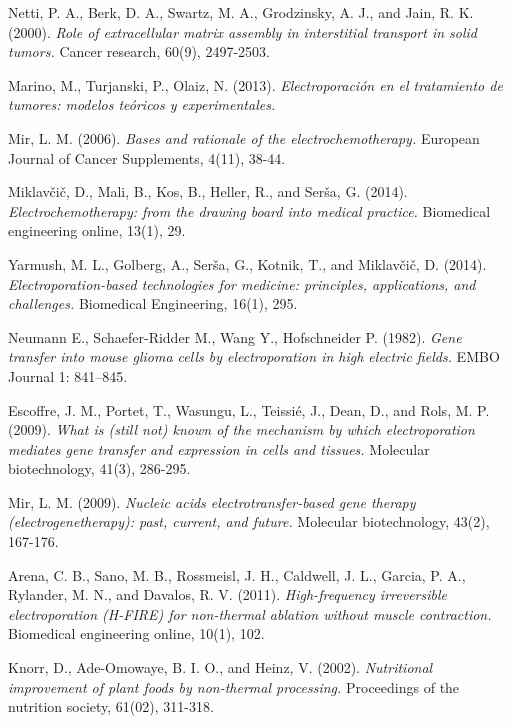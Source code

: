 \backmatter


\begin{thebibliography}{99}
	
	Netti, P. A., Berk, D. A., Swartz, M. A., Grodzinsky, A. J., and Jain, R. K. (2000). \emph{Role of extracellular matrix assembly in interstitial transport in solid tumors.} Cancer research, 60(9), 2497-2503.

	Marino, M., Turjanski, P., Olaiz, N. (2013). \emph{Electroporación en el tratamiento de tumores: modelos teóricos y experimentales.}

	Mir, L. M. (2006). \emph{Bases and rationale of the electrochemotherapy.} European Journal of Cancer Supplements, 4(11), 38-44.
	
	Miklavčič, D., Mali, B., Kos, B., Heller, R., and Serša, G. (2014). \emph{Electrochemotherapy: from the drawing board into medical practice.} Biomedical engineering online, 13(1), 29.

	Yarmush, M. L., Golberg, A., Serša, G., Kotnik, T., and Miklavčič, D. (2014). \emph{Electroporation-based technologies for medicine: principles, applications, and challenges.} Biomedical Engineering, 16(1), 295.
	
	Neumann E., Schaefer-Ridder M., Wang Y., Hofschneider P. (1982). \emph{Gene transfer into mouse glioma cells by electroporation in high electric fields.} EMBO Journal 1: 841–845.
	
	Escoffre, J. M., Portet, T., Wasungu, L., Teissié, J., Dean, D., and Rols, M. P. (2009). \emph{What is (still not) known of the mechanism by which electroporation mediates gene transfer and expression in cells and tissues.} Molecular biotechnology, 41(3), 286-295.
	
	Mir, L. M. (2009). \emph{Nucleic acids electrotransfer-based gene therapy (electrogenetherapy): past, current, and future.} Molecular biotechnology, 43(2), 167-176.
	
	Arena, C. B., Sano, M. B., Rossmeisl, J. H., Caldwell, J. L., Garcia, P. A., Rylander, M. N., and Davalos, R. V. (2011). \emph{High-frequency irreversible electroporation (H-FIRE) for non-thermal ablation without muscle contraction.} Biomedical engineering online, 10(1), 102.

	Knorr, D., Ade-Omowaye, B. I. O., and Heinz, V. (2002). \emph{Nutritional improvement of plant foods by non-thermal processing.} Proceedings of the nutrition society, 61(02), 311-318.
	

\end{thebibliography}
